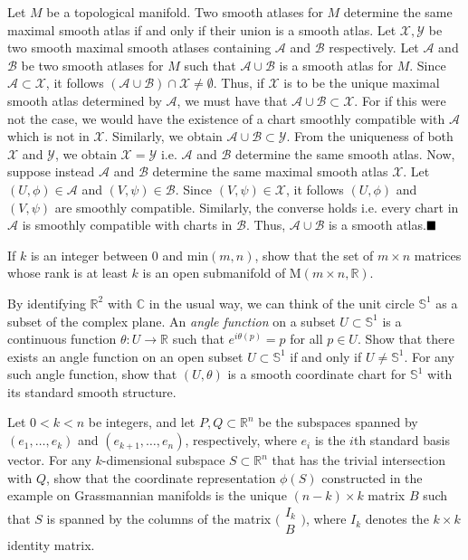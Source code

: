 \documentclass[12pt]{article}
\begin{document}
\begin{ExerciseList}
  \Exercise
  	Let $M$ be a topological manifold. Two smooth atlases for $M$ determine the same maximal smooth atlas if and only if their union is a smooth atlas.
   \Answer
   	Let $\mathcal{X},\mathcal{Y}$ be two smooth maximal smooth atlases containing $\mathcal{A}$ and $\mathcal{B}$ respectively.
	Let $\mathcal{A}$ and $\mathcal{B}$ be two smooth atlases for $M$ such that $\mathcal{A} \cup \mathcal{B}$ is a smooth atlas for $M$. Since $\mathcal{A}\subset\mathcal{X}$, it follows
	$(\mathcal{A}\cup\mathcal{B})\cap\mathcal{X}\neq\emptyset$. Thus, if $\mathcal{X}$ is to be the unique maximal smooth atlas determined by $\mathcal{A}$, 
	we must have that $\mathcal{A}\cup\mathcal{B}\subset\mathcal{X}$. For if this were not the case, we would have the existence of a chart smoothly compatible with $\mathcal{A}$ which is not
	in $\mathcal{X}$. Similarly, we obtain $\mathcal{A}\cup\mathcal{B} \subset \mathcal{Y}$. From the uniqueness of both $\mathcal{X}$ and $\mathcal{Y}$, we obtain $\mathcal{X}=\mathcal{Y}$ i.e.
	$\mathcal{A}$ and $\mathcal{B}$ determine the same smooth atlas. Now, suppose instead $\mathcal{A}$ and $\mathcal{B}$ determine the same maximal smooth atlas $\mathcal{X}$. Let
	$(U,\phi)\in\mathcal{A}$ and $(V,\psi)\in\mathcal{B}$. Since $(V,\psi)\in\mathcal{X}$, it follows $(U,\phi)$ and $(V,\psi)$ are smoothly compatible. Similarly, the converse holds i.e. every chart
	in $\mathcal{A}$ is smoothly compatible with charts in $\mathcal{B}$. Thus, $\mathcal{A}\cup\mathcal{B}$ is a smooth atlas.$\hfill\blacksquare$
	
   \Exercise
   	If $k$ is an integer between 0 and min$(m,n)$, show that the set of $m\times n$ matrices whose rank is at least $k$ is an open submanifold of M$(m\times n,\mathbb{R})$.

   \Exercise
   	By identifying $\mathbb{R}^2$ with $\mathbb{C}$ in the usual way, we can think of the unit circle $\mathbb{S}^1$ as a subset of the complex plane. An \textit{angle function} on
	a subset $U\subset\mathbb{S}^1$ is a continuous function $\theta:U\to\mathbb{R}$ such that $e^{i\theta(p)} = p$ for all $p\in U$. Show that there exists an angle function on an
	open subset $U\subset\mathbb{S}^1$ if and only if $U\neq\mathbb{S}^1$. For any such angle function, show that $(U,\theta)$ is a smooth coordinate chart for $\mathbb{S}^1$ with its
	standard smooth structure.
	
   \Exercise
   	Let $0<k<n$ be integers, and let $P,Q\subset\mathbb{R}^n$ be the subspaces spanned by $(e_1,\hdots,e_k)$ and $(e_{k+1},\hdots,e_n)$, respectively, where $e_i$ is the $i$th standard
	basis vector. For any $k$-dimensional subspace $S\subset\mathbb{R}^n$ that has the trivial intersection with $Q$, show that the coordinate representation $\phi(S)$ constructed in the
	example on Grassmannian manifolds is the unique $(n-k)\times k$ matrix $B$ such that $S$ is spanned by the columns of the matrix $\bigl( \begin{smallmatrix} I_k \\ B\end{smallmatrix}\bigr)$, where
	$I_k$ denotes the $k\times k$ identity matrix.
   	
\end{ExerciseList}
\end{document}
